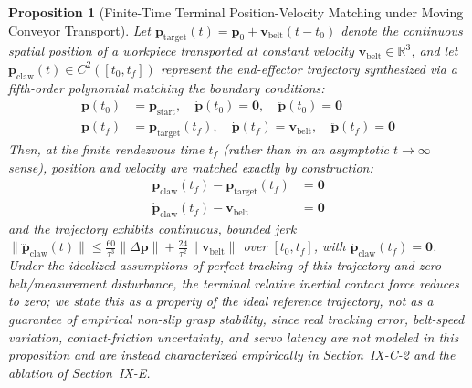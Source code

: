 \documentclass[journal]{IEEEtran}
\newtheorem{proposition}{Proposition}
\begin{document}
\begin{proposition}[Finite-Time Terminal Position-Velocity Matching under Moving Conveyor Transport]
\label{prop_rendezvous}
Let $\mathbf{p}_{\text{target}}(t) = \mathbf{p}_0 + \mathbf{v}_{\text{belt}} (t - t_0)$ denote the continuous spatial position of a workpiece transported at constant velocity $\mathbf{v}_{\text{belt}} \in \mathbb{R}^3$, and let $\mathbf{p}_{\text{claw}}(t) \in C^2([t_0, t_f])$ represent the end-effector trajectory synthesized via a fifth-order polynomial matching the boundary conditions:
\begin{align}
\mathbf{p}(t_0) &= \mathbf{p}_{\text{start}}, \quad \dot{\mathbf{p}}(t_0) = \mathbf{0}, \quad \ddot{\mathbf{p}}(t_0) = \mathbf{0} \\
\mathbf{p}(t_f) &= \mathbf{p}_{\text{target}}(t_f), \quad \dot{\mathbf{p}}(t_f) = \mathbf{v}_{\text{belt}}, \quad \ddot{\mathbf{p}}(t_f) = \mathbf{0}
\end{align}
Then, at the finite rendezvous time $t_f$ (rather than in an asymptotic $t\to\infty$ sense), position and velocity are matched exactly by construction:
    \begin{align}
    \mathbf{p}_{\text{claw}}(t_f) - \mathbf{p}_{\text{target}}(t_f) &= \mathbf{0} \\
    \dot{\mathbf{p}}_{\text{claw}}(t_f) - \mathbf{v}_{\text{belt}} &= \mathbf{0}
    \end{align}
and the trajectory exhibits continuous, bounded jerk $\|\dddot{\mathbf{p}}_{\text{claw}}(t)\| \le \frac{60}{\tau^3}\|\Delta\mathbf{p}\| + \frac{24}{\tau^2}\|\mathbf{v}_{\text{belt}}\|$ over $[t_0,t_f]$, with $\ddot{\mathbf{p}}_{\text{claw}}(t_f)=\mathbf{0}$. Under the idealized assumptions of perfect tracking of this trajectory and zero belt/measurement disturbance, the terminal relative inertial contact force reduces to zero; we state this as a property of the \emph{ideal reference trajectory}, not as a guarantee of empirical non-slip grasp stability, since real tracking error, belt-speed variation, contact-friction uncertainty, and servo latency are not modeled in this proposition and are instead characterized empirically in Section~IX-C-2 and the ablation of Section~IX-E.
\end{proposition}
\end{document}
